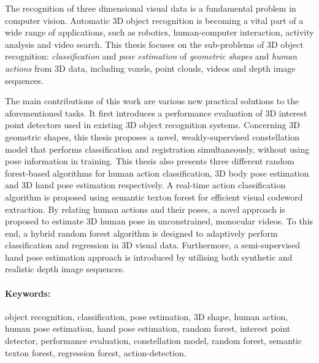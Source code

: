 \begin{abstracts}

The recognition of three dimensional visual data is a fundamental problem in computer vision. 
Automatic 3D object recognition is becoming a vital part of a wide range of applications, such as robotics, human-computer interaction, activity analysis and video search. This thesis focuses on the sub-problems of 3D object recognition: \emph{classification} and \emph{pose estimation} of \emph{geometric shapes} and \emph{human actions} from 3D data, including voxels, point clouds, videos and depth image sequences.  

The main contributions of this work are various new practical solutions to the aforementioned tasks. 
It first introduces a performance evaluation of 3D interest point detectors used in existing 3D object recognition systems.  
Concerning 3D geometric shapes, this thesis proposes a novel, weakly-supervised constellation model that performs classification and registration simultaneously, without using pose information in training. This thesis also presents three different random forest-based algorithms for human action classification, 3D body pose estimation and 3D hand pose estimation respectively. 
A real-time action classification algorithm is proposed using semantic texton forest for efficient visual codeword extraction. By relating human actions and their poses, a novel approach is proposed to estimate 3D human pose in unconstrained, monocular videos. To this end, a hybrid random forest algorithm is designed to adaptively perform classification and regression in 3D visual data.   
Furthermore, a semi-supervised hand pose estimation approach is introduced by utilising both synthetic and realistic depth image sequences. 

\paragraph{Keywords:~} object recognition, classification, pose estimation, 3D shape, human action, human pose estimation, hand pose estimation, random forest, interest point detector, performance evaluation, constellation model, random forest, semantic texton forest, regression forest, action-detection. 
\end{abstracts}


